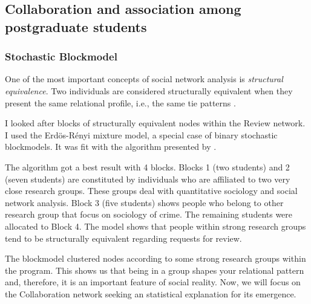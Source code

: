 \documentclass[12pt, english]{article}
\begin{document}
\subsection{Collaboration and association among postgraduate students}
\subsubsection{Stochastic Blockmodel}

One of the most important concepts of social network analysis is \textit{structural equivalence}. Two individuals are considered structurally equivalent when they present the same relational profile, i.e., the same tie patterns \cite{lazega2014redes,denooy2011exploratory,wasserman1994social}. 

I looked after blocks of structurally equivalent nodes within the Review network. I used the Erdös-Rényi mixture model, a special case of binary stochastic blockmodels. It was fit with the algorithm presented by \cite{daudin2008mixture}. 







The algorithm got a best result with 4 blocks. Blocks 1 (two students) and 2 (seven students) are constituted by individuals who are affiliated to two very close research groups. These groups deal with quantitative sociology and social network analysis. Block 3 (five students) shows people who belong to other research group that focus on sociology of crime. The remaining students were allocated to Block 4. The model shows that people within strong research groups tend to be structurally equivalent regarding requests for review.

The blockmodel clustered nodes according to some strong research groups within the program. This shows us that being in a group shapes your relational pattern and, therefore, it is an important feature of social reality. Now, we will focus on the Collaboration network seeking an statistical explanation for its emergence.
\end{document}
